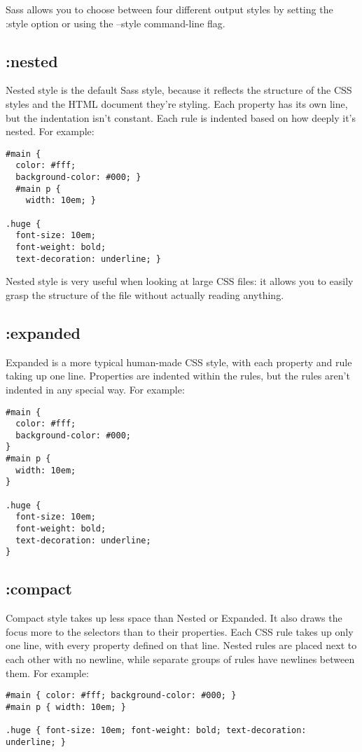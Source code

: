 \documentclass[9pt]{article}
\begin{document}
 Sass allows you to choose between four different output styles by setting the :style option or using the --style command-line flag.
\subsection{:nested}


 Nested style is the default Sass style, because it reflects the structure of the CSS styles and the HTML document they’re styling. Each property has its own line, but the indentation isn’t constant. Each rule is indented based on how deeply it’s nested. For example:
\begin{verbatim}
#main {
  color: #fff;
  background-color: #000; }
  #main p {
    width: 10em; }

.huge {
  font-size: 10em;
  font-weight: bold;
  text-decoration: underline; }
\end{verbatim}


 Nested style is very useful when looking at large CSS files: it allows you to easily grasp the structure of the file without actually reading anything.
\subsection{:expanded}


 Expanded is a more typical human-made CSS style, with each property and rule taking up one line. Properties are indented within the rules, but the rules aren’t indented in any special way. For example:
\begin{verbatim}
#main {
  color: #fff;
  background-color: #000;
}
#main p {
  width: 10em;
}

.huge {
  font-size: 10em;
  font-weight: bold;
  text-decoration: underline;
}
\end{verbatim}
\subsection{:compact}


 Compact style takes up less space than Nested or Expanded. It also draws the focus more to the selectors than to their properties. Each CSS rule takes up only one line, with every property defined on that line. Nested rules are placed next to each other with no newline, while separate groups of rules have newlines between them. For example:
\begin{verbatim}
#main { color: #fff; background-color: #000; }
#main p { width: 10em; }

.huge { font-size: 10em; font-weight: bold; text-decoration: underline; }
\end{verbatim}
\end{document}
